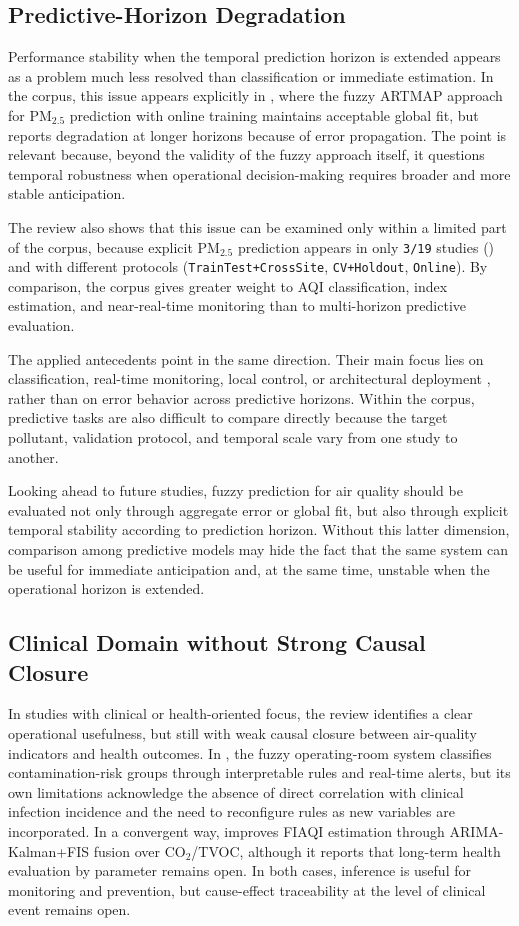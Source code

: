 \subsection{Predictive-Horizon Degradation}
Performance stability when the temporal prediction horizon is extended appears as a problem much less resolved than classification or immediate estimation. In the corpus, this issue appears explicitly in \cite{A157}, where the fuzzy ARTMAP approach for PM$_{2.5}$ prediction with online training maintains acceptable global fit, but reports degradation at longer horizons because of error propagation. The point is relevant because, beyond the validity of the fuzzy approach itself, it questions temporal robustness when operational decision-making requires broader and more stable anticipation.

The review also shows that this issue can be examined only within a limited part of the corpus, because explicit PM$_{2.5}$ prediction appears in only \texttt{3/19} studies (\cite{A135,A144,A157}) and with different protocols (\texttt{TrainTest+CrossSite}, \texttt{CV+Holdout}, \texttt{Online}). By comparison, the corpus gives greater weight to AQI classification, index estimation, and near-real-time monitoring than to multi-horizon predictive evaluation.

The applied antecedents point in the same direction. Their main focus lies on classification, real-time monitoring, local control, or architectural deployment \cite{ART04,ART05,ART06,ART07,ART08}, rather than on error behavior across predictive horizons. Within the corpus, predictive tasks are also difficult to compare directly because the target pollutant, validation protocol, and temporal scale vary from one study to another.

Looking ahead to future studies, fuzzy prediction for air quality should be evaluated not only through aggregate error or global fit, but also through explicit temporal stability according to prediction horizon. Without this latter dimension, comparison among predictive models may hide the fact that the same system can be useful for immediate anticipation and, at the same time, unstable when the operational horizon is extended.

\subsection{Clinical Domain without Strong Causal Closure}
In studies with clinical or health-oriented focus, the review identifies a clear operational usefulness, but still with weak causal closure between air-quality indicators and health outcomes. In \cite{A142}, the fuzzy operating-room system classifies contamination-risk groups through interpretable rules and real-time alerts, but its own limitations acknowledge the absence of direct correlation with clinical infection incidence and the need to reconfigure rules as new variables are incorporated. In a convergent way, \cite{A149} improves FIAQI estimation through ARIMA-Kalman+FIS fusion over CO$_2$/TVOC, although it reports that long-term health evaluation by parameter remains open. In both cases, inference is useful for monitoring and prevention, but cause-effect traceability at the level of clinical event remains open.

